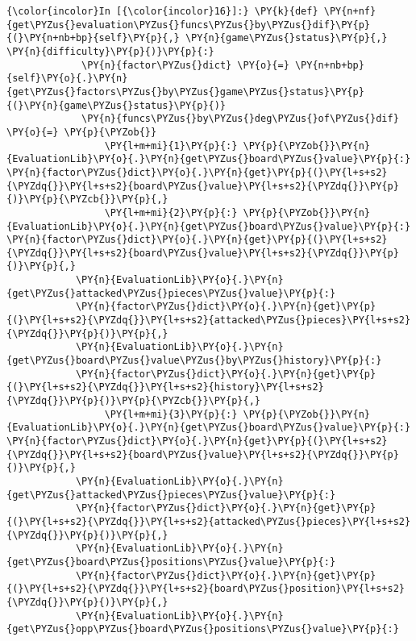     \begin{Verbatim}[commandchars=\\\{\}]
{\color{incolor}In [{\color{incolor}16}]:} \PY{k}{def} \PY{n+nf}{get\PYZus{}evaluation\PYZus{}funcs\PYZus{}by\PYZus{}dif}\PY{p}{(}\PY{n+nb+bp}{self}\PY{p}{,} \PY{n}{game\PYZus{}status}\PY{p}{,} \PY{n}{difficulty}\PY{p}{)}\PY{p}{:}
             \PY{n}{factor\PYZus{}dict} \PY{o}{=} \PY{n+nb+bp}{self}\PY{o}{.}\PY{n}{get\PYZus{}factors\PYZus{}by\PYZus{}game\PYZus{}status}\PY{p}{(}\PY{n}{game\PYZus{}status}\PY{p}{)}
             \PY{n}{funcs\PYZus{}by\PYZus{}deg\PYZus{}of\PYZus{}dif} \PY{o}{=} \PY{p}{\PYZob{}}
                 \PY{l+m+mi}{1}\PY{p}{:} \PY{p}{\PYZob{}}\PY{n}{EvaluationLib}\PY{o}{.}\PY{n}{get\PYZus{}board\PYZus{}value}\PY{p}{:} \PY{n}{factor\PYZus{}dict}\PY{o}{.}\PY{n}{get}\PY{p}{(}\PY{l+s+s2}{\PYZdq{}}\PY{l+s+s2}{board\PYZus{}value}\PY{l+s+s2}{\PYZdq{}}\PY{p}{)}\PY{p}{\PYZcb{}}\PY{p}{,}
                 \PY{l+m+mi}{2}\PY{p}{:} \PY{p}{\PYZob{}}\PY{n}{EvaluationLib}\PY{o}{.}\PY{n}{get\PYZus{}board\PYZus{}value}\PY{p}{:} \PY{n}{factor\PYZus{}dict}\PY{o}{.}\PY{n}{get}\PY{p}{(}\PY{l+s+s2}{\PYZdq{}}\PY{l+s+s2}{board\PYZus{}value}\PY{l+s+s2}{\PYZdq{}}\PY{p}{)}\PY{p}{,} 
			\PY{n}{EvaluationLib}\PY{o}{.}\PY{n}{get\PYZus{}attacked\PYZus{}pieces\PYZus{}value}\PY{p}{:} 
			\PY{n}{factor\PYZus{}dict}\PY{o}{.}\PY{n}{get}\PY{p}{(}\PY{l+s+s2}{\PYZdq{}}\PY{l+s+s2}{attacked\PYZus{}pieces}\PY{l+s+s2}{\PYZdq{}}\PY{p}{)}\PY{p}{,} 
			\PY{n}{EvaluationLib}\PY{o}{.}\PY{n}{get\PYZus{}board\PYZus{}value\PYZus{}by\PYZus{}history}\PY{p}{:} 
			\PY{n}{factor\PYZus{}dict}\PY{o}{.}\PY{n}{get}\PY{p}{(}\PY{l+s+s2}{\PYZdq{}}\PY{l+s+s2}{history}\PY{l+s+s2}{\PYZdq{}}\PY{p}{)}\PY{p}{\PYZcb{}}\PY{p}{,}
                 \PY{l+m+mi}{3}\PY{p}{:} \PY{p}{\PYZob{}}\PY{n}{EvaluationLib}\PY{o}{.}\PY{n}{get\PYZus{}board\PYZus{}value}\PY{p}{:} \PY{n}{factor\PYZus{}dict}\PY{o}{.}\PY{n}{get}\PY{p}{(}\PY{l+s+s2}{\PYZdq{}}\PY{l+s+s2}{board\PYZus{}value}\PY{l+s+s2}{\PYZdq{}}\PY{p}{)}\PY{p}{,} 
			\PY{n}{EvaluationLib}\PY{o}{.}\PY{n}{get\PYZus{}attacked\PYZus{}pieces\PYZus{}value}\PY{p}{:} 
			\PY{n}{factor\PYZus{}dict}\PY{o}{.}\PY{n}{get}\PY{p}{(}\PY{l+s+s2}{\PYZdq{}}\PY{l+s+s2}{attacked\PYZus{}pieces}\PY{l+s+s2}{\PYZdq{}}\PY{p}{)}\PY{p}{,} 
			\PY{n}{EvaluationLib}\PY{o}{.}\PY{n}{get\PYZus{}board\PYZus{}positions\PYZus{}value}\PY{p}{:} 
			\PY{n}{factor\PYZus{}dict}\PY{o}{.}\PY{n}{get}\PY{p}{(}\PY{l+s+s2}{\PYZdq{}}\PY{l+s+s2}{board\PYZus{}position}\PY{l+s+s2}{\PYZdq{}}\PY{p}{)}\PY{p}{,} 
			\PY{n}{EvaluationLib}\PY{o}{.}\PY{n}{get\PYZus{}opp\PYZus{}board\PYZus{}positions\PYZus{}value}\PY{p}{:} 

\end{Verbatim}

